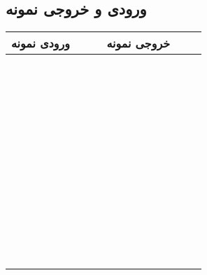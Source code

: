 \documentclass{utap}
\begin{document}
	\subsection{ورودی و خروجی نمونه}
	\begin{table}[H]
		\centering
		\begin{tabular}{|c|c|}
			\hline
			ورودی نمونه & خروجی نمونه\\
			\hline
			\hline
			\begin{latin}\begin{minipage}[]{0.3\textwidth}\footnotesize
					{}
			\end{minipage}\end{latin}
			&
			\begin{latin}\begin{minipage}[]{0.3\textwidth}\footnotesize
					
					\begin{verbatim}
					
					
					
					
					
					
					
					\end{verbatim}
			\end{minipage}\end{latin}
			\\
			\hline
			\begin{latin}\begin{minipage}[]{0.3\textwidth}\footnotesize
					{}
			\end{minipage}\end{latin}
			&
			\begin{latin}\begin{minipage}[]{0.3\textwidth}\footnotesize
					
					\begin{verbatim}
					
					
					
					
					\end{verbatim}
			\end{minipage}\end{latin}
			\\
			\hline
			\begin{latin}\begin{minipage}[]{0.3\textwidth}\footnotesize
					{}
			\end{minipage}\end{latin}
			&
			\begin{latin}\begin{minipage}[]{0.3\textwidth}\footnotesize
					
					\begin{verbatim}
					

\end{verbatim}
\end{minipage}
\end{latin}
\end{tabular}
\end{table}
\end{document}
